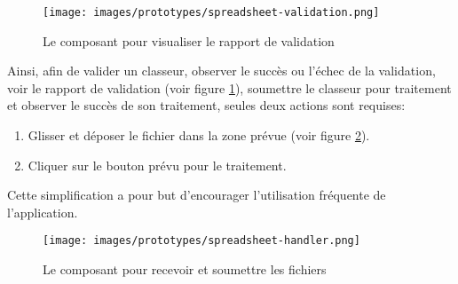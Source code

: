 \begin{figure}[ht]
    \centering
    \texttt{[image: images/prototypes/spreadsheet-validation.png]}
    \caption{Le composant pour visualiser le rapport de validation}
    \label{fig:spreadsheet-validation}
\end{figure}
Ainsi, afin de valider un classeur, observer le succès ou l'échec de la validation, voir le rapport de validation (voir figure \ref{fig:spreadsheet-validation}), soumettre le classeur pour traitement et observer le succès de son traitement, seules deux actions sont requises:
\begin{enumerate}
    \item Glisser et déposer le fichier dans la zone prévue (voir figure \ref{fig:spreadsheet-handler}).
    \item Cliquer sur le bouton prévu pour le traitement.
\end{enumerate}
Cette simplification a pour but d'encourager l'utilisation fréquente de l'application.
\begin{figure}[ht]
    \centering
    \texttt{[image: images/prototypes/spreadsheet-handler.png]}
    \caption{Le composant pour recevoir et soumettre les fichiers}
    \label{fig:spreadsheet-handler}
\end{figure}
